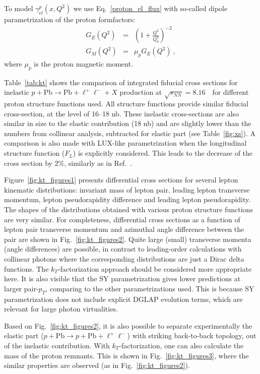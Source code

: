 To model $\gamma^{p}_{el}(x, Q^2)$ we use Eq.~\ref{proton_el_flux} with so-called dipole parametrization of the proton formfactors:
\begin{eqnarray}
G_E(Q^2) &=& \left( 1+\frac{Q^2}{Q_0^2} \right)^{-2} \\
G_M(Q^2) &=& \mu_p G_E(Q^2)~,
\end{eqnarray}
where $\mu_p$ is the proton magnetic moment.

Table~\ref{tab:kt} shows the comparison of integrated fiducial cross sections for inelastic $p+\textrm{Pb}\rightarrow \textrm{Pb} + \ell^+\ell^- + X$ production at $\sqrt{s_{N N}} = 8.16$~\TeV\ for different proton structure functions used.
All structure functions provide similar fiducial cross-section, at the level of 16--18 nb.
These inelastic cross-sections are also similar in size to the elastic contribution (18 nb) and are slightly lower than the numbers from collinear analysis, subtracted for elastic part (see Table~\ref{fig:xs}).
A comparison is also made with LUX-like parametrization when the longitudinal structure function ($F_L$) is explicitly considered.
This leads to the decrease of the cross section by 2\%, similarly as in Ref.~\cite{Luszczak:2018ntp}.

Figure~\ref{fig:kt_figures1} presents differential cross sections for several lepton kinematic distributions: invariant mass of lepton pair, leading lepton transverse momentum, lepton pseudorapidity difference and leading lepton pseudorapidity.
The shapes of the distributions obtained with various proton structure functions are very similar.
For completeness, differential cross sections as a function of lepton pair transverse momentum and azimuthal angle difference between the pair  are shown in Fig.~\ref{fig:kt_figures2}. Quite large (small) transverse momenta (angle differences) are possible, in contrast to leading-order calculations with collinear photons where the corresponding distributions are just a Dirac delta functions. 
The $k_T$-factorization approach should be considered more appropriate here. It is also visible that the SY parametrization gives lower predictions at larger pair-$p_T$, comparing to the other parametrizations used. This is because SY parametrization does not include explicit DGLAP evolution terms, which are relevant for large photon virtualities.

Based on Fig.~\ref{fig:kt_figures2}, it is also possible to separate experimentally the elastic part ($p+\textrm{Pb}\rightarrow p+ \textrm{Pb} + \ell^+\ell^-$) with striking back-to-back topology, out of the inelastic contribution.
With $k_T$-factorization, one can also calculate the mass of the proton remnants. This is shown in Fig.~\ref{fig:kt_figures3}, where the similar properties are observed (as in Fig.~\ref{fig:kt_figures2}).



